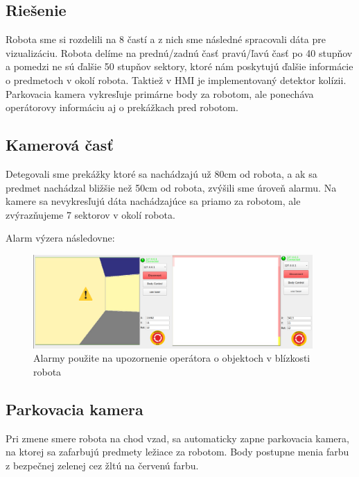 \subsection{Riešenie}

Robota sme si rozdelili na 8 častí a z nich sme následné spracovali dáta pre vizualizáciu. Robota delíme na prednú/zadnú časť
pravú/ľavú časť po 40 stupňov a pomedzi ne sú ďalšie 50 stupňov sektory, ktoré nám poskytujú ďalšie informácie o predmetoch
v okolí robota. Taktiež v HMI je implementovaný detektor kolízii. Parkovacia kamera vykresľuje primárne body za robotom,
ale ponecháva operátorovy informáciu aj o prekážkach pred robotom.

\subsection{Kamerová časť}

Detegovali sme prekážky ktoré sa nachádzajú už 80cm od robota, a ak sa predmet nachádzal bližšie než 50cm od robota, zvýšili
sme úroveň alarmu. Na kamere sa nevykresľujú dáta nachádzajúce sa priamo za robotom, ale zvýrazňujeme 7 sektorov v okolí robota.

Alarm výzera následovne:
\begin{figure}[!htbp]
	\begin{center}
		\includegraphics[width=0.95\textwidth]{img/alarm-all.png}
	\end{center}
	\caption{Alarmy použite na upozornenie operátora o objektoch v blízkosti robota}
	\label{fig:alarm}
\end{figure}

\subsection{Parkovacia kamera}

Pri zmene smere robota na chod vzad, sa automaticky zapne parkovacia kamera, na ktorej sa zafarbujú predmety ležiace za robotom.
Body postupne menia farbu z bezpečnej zelenej cez žltú na červenú farbu.

